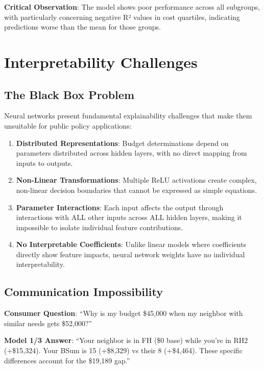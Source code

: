 \textbf{Critical Observation}: The model shows poor performance across all subgroups, with particularly concerning negative R² values in cost quartiles, indicating predictions worse than the mean for those groups.

\section{Interpretability Challenges}

\subsection{The Black Box Problem}

Neural networks present fundamental explainability challenges that make them unsuitable for public policy applications:

\begin{enumerate}
    \item \textbf{Distributed Representations}: Budget determinations depend on \ModelTenTotalParams{} parameters distributed across \ModelTenHiddenLayers{} hidden layers, with no direct mapping from inputs to outputs.
    
    \item \textbf{Non-Linear Transformations}: Multiple ReLU activations create complex, non-linear decision boundaries that cannot be expressed as simple equations.
    
    \item \textbf{Parameter Interactions}: Each input affects the output through interactions with ALL other inputs across ALL hidden layers, making it impossible to isolate individual feature contributions.
    
    \item \textbf{No Interpretable Coefficients}: Unlike linear models where coefficients directly show feature impacts, neural network weights have no individual interpretability.
\end{enumerate}

\subsection{Communication Impossibility}

\textbf{Consumer Question}: ``Why is my budget \$45,000 when my neighbor with similar needs gets \$52,000?''

\textbf{Model 1/3 Answer}: ``Your neighbor is in FH (\$0 base) while you're in RH2 (+\$15,324). Your BSum is 15 (+\$8,329) vs their 8 (+\$4,464). These specific differences account for the \$19,189 gap.''

